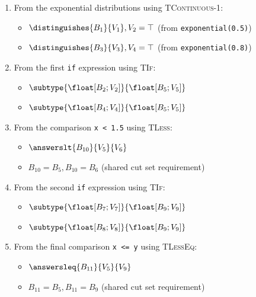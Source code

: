 \begin{example}
\begin{enumerate}
        \item From the exponential distributions using \textsc{TContinuous-1}:
        \begin{itemize}
            \item $\distinguishes{B_1}{V_1}, V_2 = \top$ (from \texttt{exponential(0.5)})
            \item $\distinguishes{B_3}{V_3}, V_4 = \top$ (from \texttt{exponential(0.8)})
        \end{itemize}
        
        \item From the first \texttt{if} expression using \textsc{TIf}:
        \begin{itemize}
            \item $\subtype{\float[B_2; V_2]}{\float[B_5; V_5]}$
            \item $\subtype{\float[B_4; V_4]}{\float[B_5; V_5]}$
        \end{itemize}
        
        \item From the comparison \texttt{x < 1.5} using \textsc{TLess}:
        \begin{itemize}
            \item $\answerslt{B_{10}}{V_5}{V_6}$
            \item $B_{10} = B_5, B_{10} = B_6$ (shared cut set requirement)
        \end{itemize}
        
        \item From the second \texttt{if} expression using \textsc{TIf}:
        \begin{itemize}
            \item $\subtype{\float[B_7; V_7]}{\float[B_9; V_9]}$
            \item $\subtype{\float[B_8; V_8]}{\float[B_9; V_9]}$
        \end{itemize}
        
        \item From the final comparison \texttt{x <= y} using \textsc{TLessEq}:
        \begin{itemize}
            \item $\answersleq{B_{11}}{V_5}{V_9}$
            \item $B_{11} = B_5, B_{11} = B_9$ (shared cut set requirement)
        \end{itemize}
    \end{enumerate}
    

\end{example}
